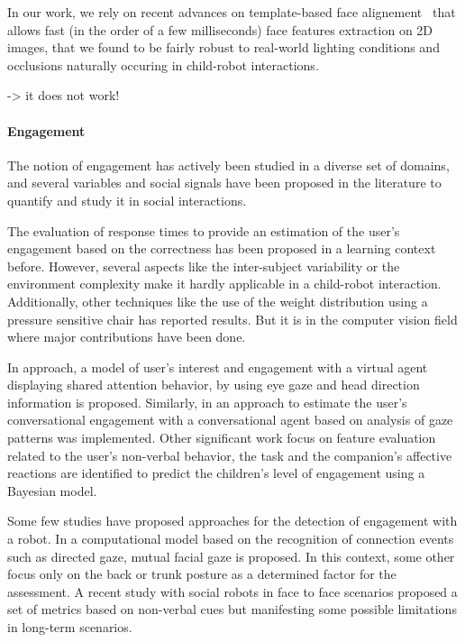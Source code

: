 \documentclass{sig-alternate}
\begin{document}
In our work, we rely on recent advances on template-based face
alignement~\cite{kazemi2014one} that allows fast (in the order of
a few milliseconds) face features extraction on 2D images, that we found to be fairly
robust to real-world lighting conditions and occlusions naturally occuring in child-robot
interactions.



\cite{kennedy2015head} -> it does not work!

\paragraph{Engagement}

The notion of engagement has actively been studied in a diverse set of domains,
and several variables and social signals have been proposed in the literature to
quantify and study it in social interactions.

The evaluation of response times to provide an estimation of the user's
engagement based on the correctness has been proposed in a learning context
\cite{Beck} before. However, several aspects like the inter-subject variability
or the environment complexity make it hardly applicable in a child-robot
interaction. Additionally, other techniques \cite{Chipman07postureas} like the
use of the weight distribution using a pressure sensitive chair has reported
results. But it is in the computer vision field where major contributions have
been done. 

In \cite{peters2010investigating} approach, a model of user's interest and
engagement with a virtual agent displaying shared attention behavior, by using
eye gaze and head direction information is proposed. Similarly, in
\cite{nakano2010estimating} an approach to estimate the user's conversational
engagement with a conversational agent based on analysis of gaze patterns was
implemented. Other significant work \cite{Castellano:2009} focus on feature
evaluation related to the user's non-verbal behavior, the task and the
companion's affective reactions are identified to predict the children's level
of engagement using a Bayesian model.

Some few studies have proposed approaches for the detection of engagement with a
robot. In \cite{Rich:2010} a computational model based on the recognition of
connection events such as directed gaze, mutual facial gaze is proposed. In this
context, some other \cite{Sanghvi:2011} focus only on the back or trunk posture
as a determined factor for the assessment. A recent study \cite{anzalone} with
social robots in face to face scenarios proposed a set of metrics based on
non-verbal cues but manifesting some possible limitations in long-term
scenarios.
\end{document}
